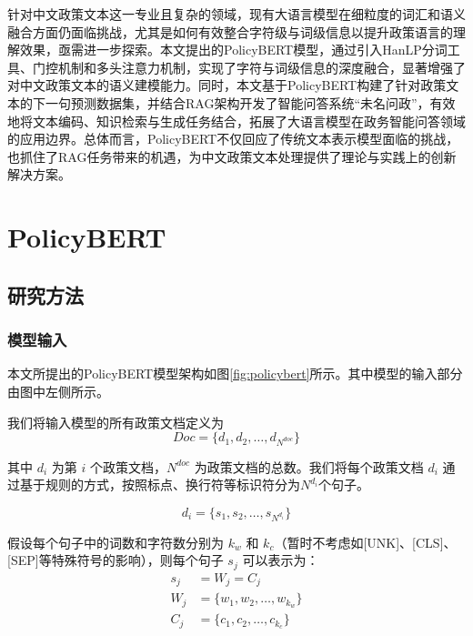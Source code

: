 \documentclass[12pt, a4paper]{ctexart}
\begin{document}
针对中文政策文本这一专业且复杂的领域，现有大语言模型在细粒度的词汇和语义融合方面仍面临挑战，尤其是如何有效整合字符级与词级信息以提升政策语言的理解效果，亟需进一步探索。本文提出的PolicyBERT模型，通过引入HanLP分词工具、门控机制和多头注意力机制，实现了字符与词级信息的深度融合，显著增强了对中文政策文本的语义建模能力。同时，本文基于PolicyBERT构建了针对政策文本的下一句预测数据集，并结合RAG架构开发了智能问答系统“未名问政”，有效地将文本编码、知识检索与生成任务结合，拓展了大语言模型在政务智能问答领域的应用边界。总体而言，PolicyBERT不仅回应了传统文本表示模型面临的挑战，也抓住了RAG任务带来的机遇，为中文政策文本处理提供了理论与实践上的创新解决方案。

\section{PolicyBERT}
\subsection{研究方法}

\subsubsection{模型输入}
本文所提出的PolicyBERT模型架构如图\ref{fig:policybert}所示。其中模型的输入部分由图中左侧所示。

我们将输入模型的所有政策文档定义为 
\begin{equation}
    Doc = \{d_1, d_2, \dots, d_{N^{doc}}\} 
\end{equation}

其中 $d_i$ 为第 $i$ 个政策文档，${N^{doc}}$ 为政策文档的总数。我们将每个政策文档 $d_i$ 通过基于规则的方式，按照标点、换行符等标识符分为$N^{d_i}$个句子。 

\begin{equation}
   d_i = \{s_1, s_2, \dots, s_{N^{d_i}}\} 
\end{equation}

假设每个句子中的词数和字符数分别为 $k_w$ 和 $k_c$（暂时不考虑如[UNK]、[CLS]、[SEP]等特殊符号的影响），则每个句子 $s_j$ 可以表示为：
\begin{equation}
    \begin{split}
        s_j &= W_j = C_j \\
        W_j &= \{w_1, w_2, \dots, w_{k_w}\} \\
        C_j &= \{c_1, c_2, \dots, c_{k_c}\}
    \end{split}
\end{equation}
\end{document}
